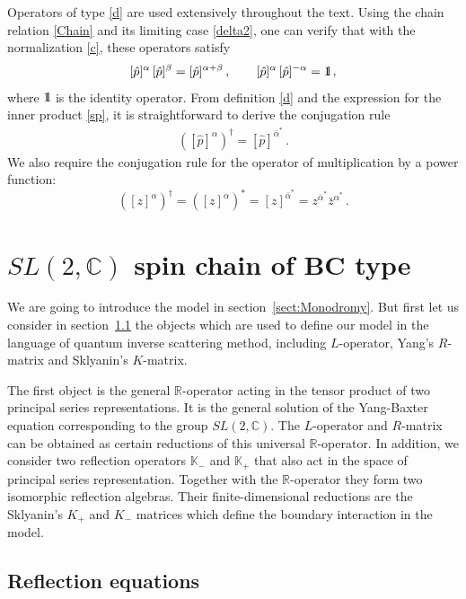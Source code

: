 \documentclass[a4paper,11pt]{article}
\def\II{\hbox{{1}\kern-.25em\hbox{l}}}
\numberwithin{equation}{section}
\begin{document}
Operators of type \eqref{d} are used extensively throughout the text. Using the chain relation \eqref{Chain} and its limiting case \eqref{delta2}, one can verify that with the normalization \eqref{c}, these operators satisfy
\begin{equation} \nonumber
    [\hat{p}]^\alpha\,[\hat{p}]^\beta=[\hat{p}]^{\alpha+\beta} \,, \qquad
    [\hat{p}]^\alpha\,[\hat{p}]^{-\alpha} = \II \,,
\end{equation}
where $\II$ is the identity operator.
From definition \eqref{d} and the expression for the inner product \eqref{sp}, it is straightforward to derive the conjugation rule
\begin{align} \nonumber
    \left(\left[\hat{p}\right]^{\alpha}\right)^{\dagger} =  
    \left[\hat{p}\right]^{\bar{\alpha}^*} \,.
\end{align}
We also require the conjugation rule for the operator of multiplication by a power function:
\begin{equation} \nonumber
    ([z]^\alpha)^\dagger=([z]^\alpha)^\ast=[z]^{\bar{\alpha}^\ast}=z^{\bar{\alpha}^\ast}\bar{z}^{\alpha^\ast} \,.
\end{equation}


\section{$SL(2,\mathbb{C})$ spin chain of BC type}

We are going to introduce the model in section~\ref{sect:Monodromy}.
But first let us consider in section~\ref{sect:ReflEq} the objects which are used to define our model in the language of quantum inverse scattering method, including $L$-operator, Yang's $R$-matrix and Sklyanin's $K$-matrix.

The first object is the general $\mathbb{R}$-operator acting in the tensor product of two principal series representations. It is the general solution of the Yang-Baxter equation corresponding to the group $SL(2,\mathbb{C})$. The $L$-operator and $R$-matrix can be obtained as certain reductions of this universal $\mathbb{R}$-operator.
In addition, we consider two reflection operators $\mathbb{K}_-$ and $\mathbb{K}_+$ that also act in the space of principal series representation. Together with the $\mathbb{R}$-operator they form two isomorphic reflection algebras. Their finite-dimensional reductions are the Sklyanin's $K_{+}$ and $K_-$ matrices which define the boundary interaction in the model. 


\subsection{Reflection equations} \label{sect:ReflEq}
\end{document}
